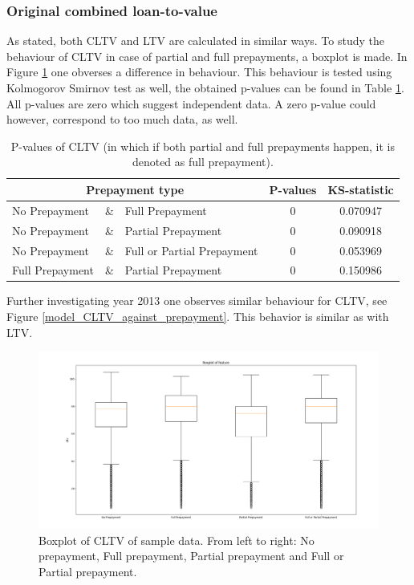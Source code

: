     \subsubsection{Original combined loan-to-value}
        As stated, both CLTV and LTV are calculated in similar ways. To study the behaviour of CLTV in case of partial and full prepayments, a boxplot is made. In Figure \ref{model_boxplot_CLTV} one obverses a difference in behaviour. This behaviour is tested using Kolmogorov Smirnov test as well, the obtained p-values can be found in Table \ref{model_Pvals_of_CLTV}. All p-values are zero which suggest independent data. A zero p-value could however, correspond to too much data, as well.
        \begin{table}[H]
        \centering
            \begin{tabular}{lcl|c|c}
            \multicolumn{3}{c|}{Prepayment type} & P-values& KS-statistic \\\hline
            No Prepayment & \& & Full Prepayment & 0 & 0.070947\\
            No Prepayment & \& & Partial Prepayment & 0 & 0.090918\\
            No Prepayment & \& & Full or Partial Prepayment & 0 & 0.053969 \\
            Full Prepayment & \& & Partial Prepayment & 0 & 0.150986
		    \end{tabular}
            \caption{P-values of CLTV (in which if both partial and full prepayments happen, it is denoted as full prepayment).}
	        \label{model_Pvals_of_CLTV}
        \end{table}
        Further investigating year 2013 one observes similar behaviour for CLTV, see Figure \ref{model_CLTV_against_prepayment}. This behavior is similar as with LTV.
        \begin{figure}[H]
            \centering
            \includegraphics[width=\linewidth]{Latex/Report/Figures/Boxplot_of_cltv_[2013, 2014, 2015, 2016, 2017, 2018, 2019, 2020]_.png}
            \caption{Boxplot of CLTV of sample data. From left to right: No prepayment, Full prepayment, Partial prepayment and Full or Partial prepayment.}
            \label{model_boxplot_CLTV}
        \end{figure}
